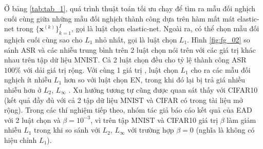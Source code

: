Ở bảng \ref{tab:tab_1}, quá trình thuật toán tối ưu chạy để tìm ra mẫu đối nghịch cuối cùng giữa những mẫu đối nghịch thành công dựa trên hàm mất mát elastic-net trong $\{\mathbf{x}^{(k)}\}^I_{k=1}$, gọi là luật chọn elastic-net. Ngoài ra, có thể chọn mẫu đối nghịch cuối cùng sao cho $L_1$ nhỏ nhất, gọi là luật chọn $L_1$. Hình \ref{fig:fg_02} so sánh ASR và các nhiễu trung bình trên 2 luật chọn nói trên với các giá trị  khác nhau trên tập dữ liệu MNIST. Cả 2 luật chọn đều cho tỷ lệ thành công ASR $100\%$ với dải giá trị  rộng. Với cùng 1 giá trị , luật chọn $L_1$ cho ra các mẫu đối nghịch ít nhiễu $L_1$ hơn so với luật chọn EN, trong khi đó lại bị trả giá nhiều nhiễu hơn ở $L_2$, $L_{\infty}$ . Xu hướng tương tự cũng được quan sát thấy với CIFAR10 (kết quả đầy đủ với cả 2 tập dữ liệu MNIST và CIFAR có trong tài liệu mở rộng). Trong các thí nghiệm tiếp theo, nhóm tác giả báo cáo kết quả của EAD với 2 luật chọn và $\beta = 10^{-3}$, vì trên tập MNIST và CIFAR10 giá trị $\beta$ làm giảm nhiễu $L_1$ trong khi so sánh với $L_2$, $L_{\infty}$ với trường hợp $\beta = 0$ (nghĩa là không có hiệu chỉnh $L_1$).

